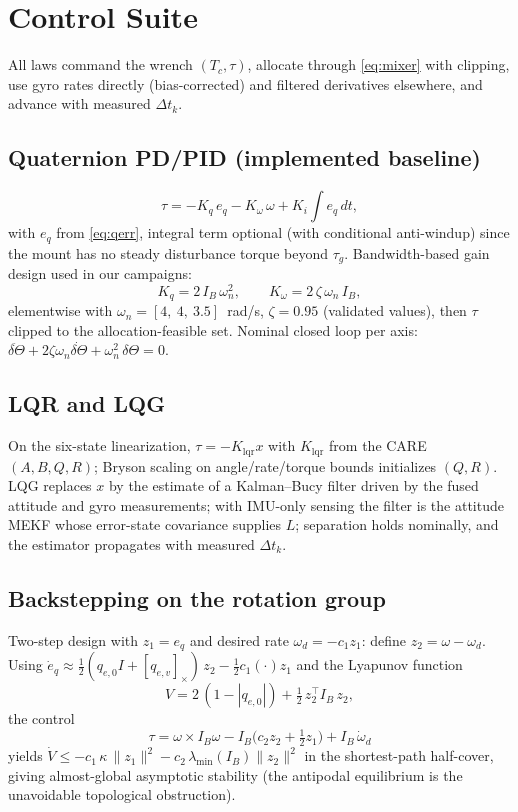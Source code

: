 \documentclass[conference]{IEEEtran}
\newcommand{\skewm}[1]{[#1]_\times}
\begin{document}
\section{Control Suite}
All laws command the wrench $(T_c, \tau)$, allocate through \eqref{eq:mixer} with clipping, use gyro rates directly (bias-corrected) and filtered derivatives elsewhere, and advance with measured $\Delta t_k$.

\subsection{Quaternion PD/PID (implemented baseline)}
\begin{equation}
\tau = -K_q\,e_q - K_\omega\,\omega + K_i\!\int e_q\,dt,
\label{eq:qpd}
\end{equation}
with $e_q$ from \eqref{eq:qerr}, integral term optional (with conditional anti-windup) since the mount has no steady disturbance torque beyond $\tau_g$. Bandwidth-based gain design used in our campaigns:
\begin{equation}
K_q = 2\,I_B\,\omega_n^2,\qquad K_\omega = 2\,\zeta\,\omega_n\, I_B,
\end{equation}
elementwise with $\omega_n = [4,\ 4,\ 3.5]$~rad/s, $\zeta = 0.95$ (validated values), then $\tau$ clipped to the allocation-feasible set. Nominal closed loop per axis: $\ddot{\delta\Theta} + 2\zeta\omega_n\dot{\delta\Theta} + \omega_n^2\,\delta\Theta = 0$.

\subsection{LQR and LQG}
On the six-state linearization, $\tau = -K_{\mathrm{lqr}}x$ with $K_{\mathrm{lqr}}$ from the CARE $(A,B,Q,R)$; Bryson scaling on angle/rate/torque bounds initializes $(Q,R)$. LQG replaces $x$ by the estimate of a Kalman--Bucy filter driven by the fused attitude and gyro measurements; with IMU-only sensing the filter is the attitude MEKF whose error-state covariance supplies $L$; separation holds nominally, and the estimator propagates with measured $\Delta t_k$.

\subsection{Backstepping on the rotation group}
Two-step design with $z_1 = e_q$ and desired rate $\omega_d = -c_1 z_1$: define $z_2 = \omega - \omega_d$. Using $\dot e_q \approx \tfrac12(q_{e,0} I + \skewm{q_{e,v}})\,z_2 - \tfrac12 c_1 (\cdot)z_1$ and the Lyapunov function
\begin{equation}
V = 2\,(1 - |q_{e,0}|) + \tfrac12\, z_2^{\!\top} I_B\, z_2 ,
\end{equation}
the control
\begin{equation}
\tau = \omega\times I_B\omega - I_B\bigl(c_2 z_2 + \tfrac12 z_1\bigr) + I_B\,\dot\omega_d
\end{equation}
yields $\dot V \le -c_1\,\kappa\,\|z_1\|^2 - c_2\,\lambda_{\min}(I_B)\|z_2\|^2$ in the shortest-path half-cover, giving almost-global asymptotic stability (the antipodal equilibrium is the unavoidable topological obstruction).
\end{document}
